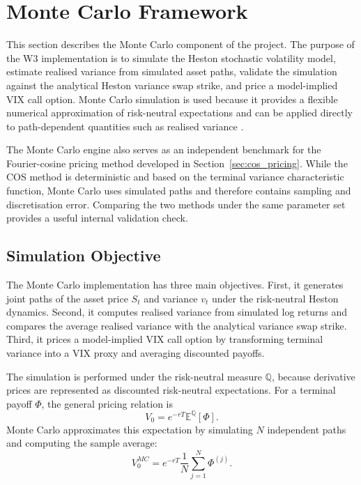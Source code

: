 \section{Monte Carlo Framework}
\label{sec:monte_carlo}

This section describes the Monte Carlo component of the project. The purpose of the W3 implementation is to simulate the Heston stochastic volatility model, estimate realised variance from simulated asset paths, validate the simulation against the analytical Heston variance swap strike, and price a model-implied VIX call option. Monte Carlo simulation is used because it provides a flexible numerical approximation of risk-neutral expectations and can be applied directly to path-dependent quantities such as realised variance \citep{hirsa2024}.

The Monte Carlo engine also serves as an independent benchmark for the Fourier-cosine pricing method developed in Section~\ref{sec:cos_pricing}. While the COS method is deterministic and based on the terminal variance characteristic function, Monte Carlo uses simulated paths and therefore contains sampling and discretisation error. Comparing the two methods under the same parameter set provides a useful internal validation check.

\subsection{Simulation Objective}

The Monte Carlo implementation has three main objectives. First, it generates joint paths of the asset price \(S_t\) and variance \(v_t\) under the risk-neutral Heston dynamics. Second, it computes realised variance from simulated log returns and compares the average realised variance with the analytical variance swap strike. Third, it prices a model-implied VIX call option by transforming terminal variance into a VIX proxy and averaging discounted payoffs.

The simulation is performed under the risk-neutral measure \(\mathbb{Q}\), because derivative prices are represented as discounted risk-neutral expectations. For a terminal payoff \(\Phi\), the general pricing relation is
\begin{equation}
V_0
=
e^{-rT}
\mathbb{E}^{\mathbb{Q}}[\Phi].
\end{equation}
Monte Carlo approximates this expectation by simulating \(N\) independent paths and computing the sample average:
\begin{equation}
V_0^{MC}
=
e^{-rT}
\frac{1}{N}
\sum_{j=1}^{N}
\Phi^{(j)}.
\end{equation}

